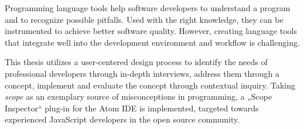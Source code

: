 Programming language tools help software developers to understand a
program and to recognize possible pitfalls. Used with the right
knowledge, they can be instrumented to achieve better software quality.
However, creating language tools that integrate well into the
development environment and workflow is challenging.

This thesis utilizes a user-centered design process to identify the
needs of professional developers through in-depth interviews, address
them through a concept, implement and evaluate the concept through
contextual inquiry. Taking \emph{scope} as an exemplary source of
misconceptions in programming, a „Scope Inspector“ plug-in for the Atom
IDE is implemented, targeted towards experienced JavaScript developers
in the open source community.
